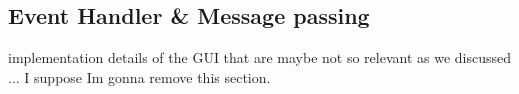 

		\subsection{Event Handler \& Message passing}
		implementation details of the GUI that are maybe not so relevant as we discussed ... I suppose Im gonna remove this section.




